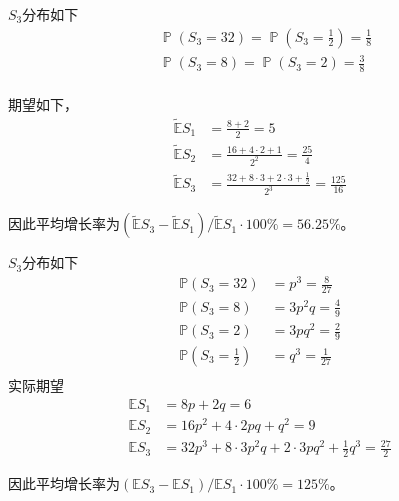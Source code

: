 \documentclass[cn]{homework}
\DeclareMathOperator{\prob}{\mathbb P}
\begin{document}
    \problem
    \begin{subproblem}
        \item
        $S_3$分布如下
        \[\begin{aligned}
            &\prob(S_3=32)
            =\prob\left(S_3=\frac{1}{2}\right)
            =\frac{1}{8}\\
            &\prob(S_3=8)
            =\prob(S_3=2)
            =\frac{3}{8}\\
        \end{aligned}\]

        \item
        \newcommand{\E}{\tilde{\mathbb E}}
        期望如下，
        \[\begin{aligned}
            \E S_1&=\frac{8+2}{2}=5\\
            \E S_2&=\frac{16+4\cdot 2+1}{2^2}=\frac{25}{4}\\
            \E S_3&=\frac{32+8\cdot 3+2\cdot 3+\frac{1}{2}}{2^3}
            =\frac{125}{16}
        \end{aligned}\]

        因此平均增长率为$(\E S_3-\E S_1)/\E S_1\cdot 100\%=56.25\%$。

        \item
        \newcommand{\preal}{\mathbb P}
        $S_3$分布如下
        \[\begin{aligned}
            \preal(S_3=32)&=p^3=\frac{8}{27}\\
            \preal(S_3=8)&=3p^2q=\frac{4}{9}\\
            \preal(S_3=2)&=3pq^2=\frac{2}{9}\\
            \preal\left(S_3=\frac{1}{2}\right)&=q^3=\frac{1}{27}\\
        \end{aligned}\]
        实际期望
        \renewcommand{\E}{\mathbb E}
        \[\begin{aligned}
            \E S_1&=8p+2q=6\\
            \E S_2&=16p^2+4\cdot 2pq+q^2=9\\
            \E S_3&=32p^3+8\cdot 3p^2q+2\cdot 3pq^2+\frac{1}{2}q^3
            =\frac{27}{2}
        \end{aligned}\]

        因此平均增长率为$(\E S_3-\E S_1)/\E S_1\cdot 100\%=125\%$。
    \end{subproblem}
\end{document}
